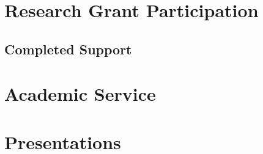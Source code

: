\documentclass[11pt,a4paper]{moderncv}
\begin{document}
%


\section{Research Grant Participation}


\subsection{Completed Support}


\section{Academic Service}


\section{Presentations}



%


%





 
\end{document}
